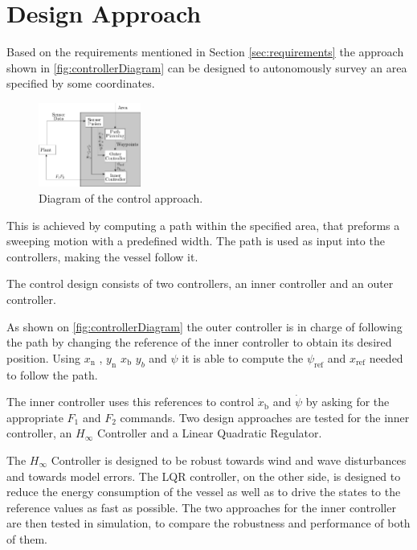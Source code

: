 \chapter{Design Approach} \label{chap:designaproach}
Based on the requirements mentioned in Section \ref{sec:requirements} the approach shown in \autoref{fig:controllerDiagram} can be designed to autonomously survey an area specified by some coordinates.
\begin{figure}[H]
    \includegraphics[width=0.3\textwidth]{figures/controllerDiagram2}
    \caption{Diagram of the control approach.}
    \label{fig:controllerDiagram}
\end{figure}
This is achieved by computing a path within the specified area, that preforms a sweeping motion with a predefined width. The path is used as input into the controllers, making the vessel follow it. 

The control design consists of two controllers, an inner controller and an outer controller. 

As shown on \autoref{fig:controllerDiagram} the outer controller is in charge of following the path by changing the reference of the inner controller to obtain its desired position. Using $x_\mathrm{n}$ , $y_\mathrm{n}$ $x_\mathrm{b}$ $y_b$ and $\psi$ it is able to compute the $\psi_\mathrm{ref}$ and $x_\mathrm{ref}$ needed to follow the path. 

The inner controller uses this references to control $\dot{x}_\mathrm{b}$ and $\dot{\psi}$ by asking for the appropriate $F_{1}$ and $F_{2}$ commands. Two design approaches are tested for the inner controller, an $H_{\infty}$ Controller and a Linear Quadratic Regulator.

The $H_{\infty}$ Controller is designed to be robust towards wind and wave disturbances and towards model errors. The LQR controller, on the other side, is designed to reduce the energy consumption of the vessel as well as to drive the states to the reference values as fast as possible. 
The two approaches for the inner controller are then tested in simulation, to compare the robustness and performance of both of them. 

